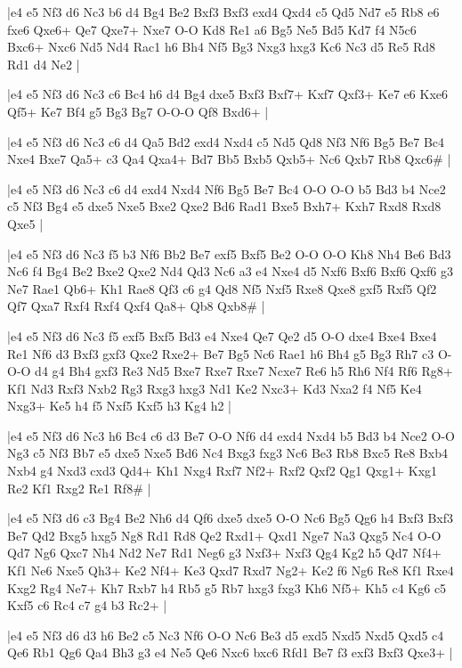 \whitename{}
\blackname{}
\makegametitle
|e4 e5 Nf3 d6 Nc3 b6 d4 Bg4 Be2 Bxf3 Bxf3 exd4 Qxd4 c5 Qd5 Nd7 e5 Rb8 e6 fxe6 Qxe6+ Qe7 Qxe7+ Nxe7 O-O Kd8 Re1 a6 Bg5 Ne5 Bd5 Kd7 f4 N5c6 Bxc6+ Nxc6 Nd5 Nd4 Rac1 h6 Bh4 Nf5 Bg3 Nxg3 hxg3 Kc6 Nc3 d5 Re5 Rd8 Rd1 d4 Ne2  |

\whitename{}
\blackname{}
\makegametitle
|e4 e5 Nf3 d6 Nc3 c6 Bc4 h6 d4 Bg4 dxe5 Bxf3 Bxf7+ Kxf7 Qxf3+ Ke7 e6 Kxe6 Qf5+ Ke7 Bf4 g5 Bg3 Bg7 O-O-O Qf8 Bxd6+  |

\whitename{}
\blackname{}
\makegametitle
|e4 e5 Nf3 d6 Nc3 c6 d4 Qa5 Bd2 exd4 Nxd4 c5 Nd5 Qd8 Nf3 Nf6 Bg5 Be7 Bc4 Nxe4 Bxe7 Qa5+ c3 Qa4 Qxa4+ Bd7 Bb5 Bxb5 Qxb5+ Nc6 Qxb7 Rb8 Qxc6\#  |

\whitename{}
\blackname{}
\makegametitle
|e4 e5 Nf3 d6 Nc3 c6 d4 exd4 Nxd4 Nf6 Bg5 Be7 Bc4 O-O O-O b5 Bd3 b4 Nce2 c5 Nf3 Bg4 e5 dxe5 Nxe5 Bxe2 Qxe2 Bd6 Rad1 Bxe5 Bxh7+ Kxh7 Rxd8 Rxd8 Qxe5  |

\whitename{}
\blackname{}
\makegametitle
|e4 e5 Nf3 d6 Nc3 f5 b3 Nf6 Bb2 Be7 exf5 Bxf5 Be2 O-O O-O Kh8 Nh4 Be6 Bd3 Nc6 f4 Bg4 Be2 Bxe2 Qxe2 Nd4 Qd3 Nc6 a3 e4 Nxe4 d5 Nxf6 Bxf6 Bxf6 Qxf6 g3 Ne7 Rae1 Qb6+ Kh1 Rae8 Qf3 c6 g4 Qd8 Nf5 Nxf5 Rxe8 Qxe8 gxf5 Rxf5 Qf2 Qf7 Qxa7 Rxf4 Rxf4 Qxf4 Qa8+ Qb8 Qxb8\#  |

\whitename{}
\blackname{}
\makegametitle
|e4 e5 Nf3 d6 Nc3 f5 exf5 Bxf5 Bd3 e4 Nxe4 Qe7 Qe2 d5 O-O dxe4 Bxe4 Bxe4 Re1 Nf6 d3 Bxf3 gxf3 Qxe2 Rxe2+ Be7 Bg5 Nc6 Rae1 h6 Bh4 g5 Bg3 Rh7 c3 O-O-O d4 g4 Bh4 gxf3 Re3 Nd5 Bxe7 Rxe7 Rxe7 Ncxe7 Re6 h5 Rh6 Nf4 Rf6 Rg8+ Kf1 Nd3 Rxf3 Nxb2 Rg3 Rxg3 hxg3 Nd1 Ke2 Nxc3+ Kd3 Nxa2 f4 Nf5 Ke4 Nxg3+ Ke5 h4 f5 Nxf5 Kxf5 h3 Kg4 h2  |

\whitename{}
\blackname{}
\makegametitle
|e4 e5 Nf3 d6 Nc3 h6 Bc4 c6 d3 Be7 O-O Nf6 d4 exd4 Nxd4 b5 Bd3 b4 Nce2 O-O Ng3 c5 Nf3 Bb7 e5 dxe5 Nxe5 Bd6 Nc4 Bxg3 fxg3 Nc6 Be3 Rb8 Bxc5 Re8 Bxb4 Nxb4 g4 Nxd3 cxd3 Qd4+ Kh1 Nxg4 Rxf7 Nf2+ Rxf2 Qxf2 Qg1 Qxg1+ Kxg1 Re2 Kf1 Rxg2 Re1 Rf8\#  |

\whitename{}
\blackname{}
\makegametitle
|e4 e5 Nf3 d6 c3 Bg4 Be2 Nh6 d4 Qf6 dxe5 dxe5 O-O Nc6 Bg5 Qg6 h4 Bxf3 Bxf3 Be7 Qd2 Bxg5 hxg5 Ng8 Rd1 Rd8 Qe2 Rxd1+ Qxd1 Nge7 Na3 Qxg5 Nc4 O-O Qd7 Ng6 Qxc7 Nh4 Nd2 Ne7 Rd1 Neg6 g3 Nxf3+ Nxf3 Qg4 Kg2 h5 Qd7 Nf4+ Kf1 Ne6 Nxe5 Qh3+ Ke2 Nf4+ Ke3 Qxd7 Rxd7 Ng2+ Ke2 f6 Ng6 Re8 Kf1 Rxe4 Kxg2 Rg4 Ne7+ Kh7 Rxb7 h4 Rb5 g5 Rb7 hxg3 fxg3 Kh6 Nf5+ Kh5 c4 Kg6 c5 Kxf5 c6 Rc4 c7 g4 b3 Rc2+  |

\whitename{}
\blackname{}
\makegametitle
|e4 e5 Nf3 d6 d3 h6 Be2 c5 Nc3 Nf6 O-O Nc6 Be3 d5 exd5 Nxd5 Nxd5 Qxd5 c4 Qe6 Rb1 Qg6 Qa4 Bh3 g3 e4 Ne5 Qe6 Nxc6 bxc6 Rfd1 Be7 f3 exf3 Bxf3 Qxe3+  |

